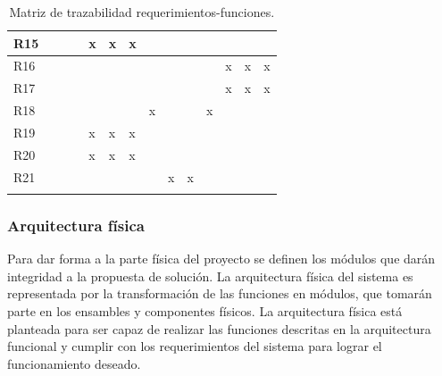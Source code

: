 \begin{center}
\begin{longtable}[!htb]{| m{2em} || m{2em} | m{2em}| m{2em}| m{2em}| m{2em}| m{2em}| m{2em}| m{2em}| m{2em}| m{2em}| m{2em}| m{2em}| m{2em}|}
    \hline
    R15 & & & &\cellcolor{gr}x &\cellcolor{gr}x &\cellcolor{gr}x & & & & & & &\\
    \hline
    R16 & & & & & & & & & & & \cellcolor{gr}x& \cellcolor{gr}x&\cellcolor{gr}x\\
    \hline
    R17 & & & & & & & & & & & \cellcolor{gr}x& \cellcolor{gr}x&\cellcolor{gr}x\\
    \hline
    R18 & & & & & & &\cellcolor{gr}x & & &\cellcolor{gr}x & & &\\
    \hline
    R19 & & & &\cellcolor{gr}x &\cellcolor{gr}x &\cellcolor{gr}x & & & & & & &\\
    \hline
    R20 & & & &\cellcolor{gr}x &\cellcolor{gr}x &\cellcolor{gr}x & & & & & & &\\
    \hline
    R21 & & & & & & & &\cellcolor{gr}x &\cellcolor{gr}x & & & &\\
    \hline

    \caption{\footnotesize Matriz de trazabilidad requerimientos-funciones.}
    \label{tab:MatTraza_ReqFun}
    \end{longtable}
\end{center}

\subsubsection{Arquitectura física}
Para dar forma a la parte física del proyecto se definen los módulos que darán integridad a la propuesta de solución. La arquitectura física del sistema es representada por la transformación de las funciones en módulos, que tomarán parte en los ensambles y componentes físicos. La arquitectura física está planteada para ser capaz de realizar las funciones descritas en la arquitectura funcional y cumplir con los requerimientos del sistema para lograr el funcionamiento deseado.


